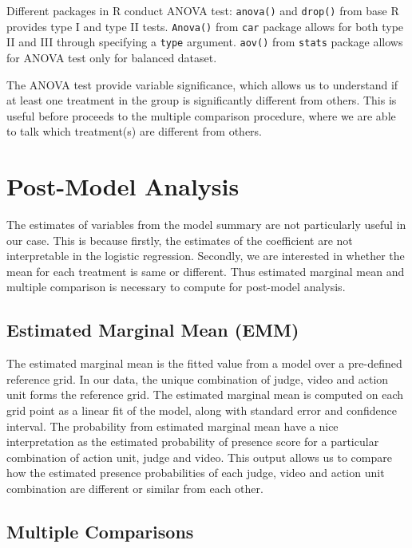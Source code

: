 \documentclass{monashthesis}
\begin{document}
Different packages in R conduct ANOVA test: \texttt{anova()} and \texttt{drop()} from base R provides type I and type II tests. \texttt{Anova()} from \texttt{car} package allows for both type II and III through specifying a \texttt{type} argument. \texttt{aov()} from \texttt{stats} package allows for ANOVA test only for balanced dataset.

The ANOVA test provide variable significance, which allows us to understand if at least one treatment in the group is significantly different from others. This is useful before proceeds to the multiple comparison procedure, where we are able to talk which treatment(s) are different from others.

\hypertarget{post-model-analysis}{%
\section{Post-Model Analysis}\label{post-model-analysis}}

The estimates of variables from the model summary are not particularly useful in our case. This is because firstly, the estimates of the coefficient are not interpretable in the logistic regression. Secondly, we are interested in whether the mean for each treatment is same or different. Thus estimated marginal mean and multiple comparison is necessary to compute for post-model analysis.

\hypertarget{estimated-marginal-mean-emm}{%
\subsection{Estimated Marginal Mean (EMM)}\label{estimated-marginal-mean-emm}}

The estimated marginal mean is the fitted value from a model over a pre-defined reference grid. In our data, the unique combination of judge, video and action unit forms the reference grid. The estimated marginal mean is computed on each grid point as a linear fit of the model, along with standard error and confidence interval. The probability from estimated marginal mean have a nice interpretation as the estimated probability of presence score for a particular combination of action unit, judge and video. This output allows us to compare how the estimated presence probabilities of each judge, video and action unit combination are different or similar from each other.

\hypertarget{multiple-comparisons}{%
\subsection{Multiple Comparisons}\label{multiple-comparisons}}
\end{document}
